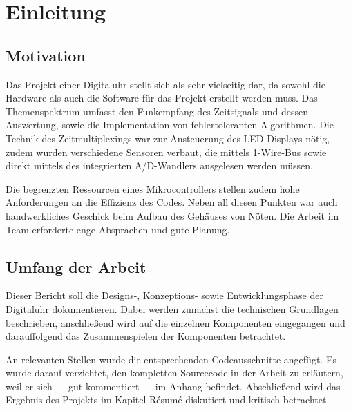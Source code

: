 \section{Einleitung}
\subsection{Motivation}
Das Projekt einer Digitaluhr stellt sich als sehr vielseitig dar, da sowohl die
Hardware als auch die Software für das Projekt erstellt werden muss. Das
Themenspektrum umfasst den Funkempfang des Zeitsignals und dessen Auswertung,
sowie die Implementation von fehlertoleranten Algorithmen. Die Technik des
Zeitmultiplexings war zur Ansteuerung des LED Displays nötig, zudem
wurden verschiedene Sensoren verbaut, die mittels 1-Wire-Bus sowie direkt mittels
des integrierten A/D-Wandlers ausgelesen werden müssen.

Die begrenzten Ressourcen eines Mikrocontrollers stellen zudem hohe
Anforderungen an die Effizienz des Codes. Neben all diesen Punkten war auch
handwerkliches Geschick beim Aufbau des Gehäuses von Nöten. Die Arbeit im Team
erforderte enge Absprachen und gute Planung.

\subsection{Umfang der Arbeit}
Dieser Bericht soll die Designs-, Konzeptions- sowie Entwicklungsphase der Digitaluhr dokumentieren. Dabei werden zunächst die technischen Grundlagen beschrieben, anschließend wird auf die einzelnen Komponenten eingegangen und darauffolgend das Zusammenspielen der Komponenten betrachtet. 

An relevanten Stellen wurde die entsprechenden Codeausschnitte angefügt. Es wurde darauf verzichtet, den kompletten Sourcecode in der Arbeit zu erläutern, weil er sich --- gut kommentiert --- im Anhang befindet. Abschließend wird das Ergebnis des Projekts im Kapitel Résumé diskutiert und kritisch betrachtet.